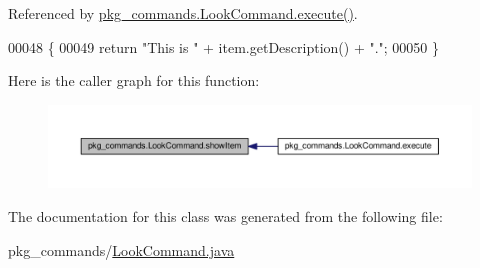 Referenced by \hyperlink{LookCommand_8java_source_l00026}{pkg\-\_\-commands.\-Look\-Command.\-execute()}.


\begin{DoxyCode}
00048                                        \{
00049         \textcolor{keywordflow}{return} \textcolor{stringliteral}{"This is "} + item.getDescription() + \textcolor{stringliteral}{"."};
00050     \}
\end{DoxyCode}


Here is the caller graph for this function\-:\nopagebreak
\begin{figure}[H]
\begin{center}
\leavevmode
\includegraphics[width=350pt]{classpkg__commands_1_1LookCommand_a17808882dffb0a9edce192235c029ddf_icgraph}
\end{center}
\end{figure}




The documentation for this class was generated from the following file\-:\begin{DoxyCompactItemize}
\item 
pkg\-\_\-commands/\hyperlink{LookCommand_8java}{Look\-Command.\-java}\end{DoxyCompactItemize}
